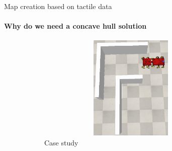 \documentclass[aspectratio=169]{beamer}
\begin{document}
\begin{frame}[t]{Map creation based on tactile data}
    \framesubtitle{Why do we need a concave hull solution}
    \vspace{-15pt}
    \begin{figure}[H]
        \begin{subfigure}[t]{0.3\textwidth}
            \centering\includegraphics[height=5cm,width=1\textwidth,keepaspectratio]{convex_terr.png}
            \caption*{Case study}
            \label{fig:convex_terr.png}
        \end{subfigure}
        \hfill
        \begin{subfigure}[t]{0.33\textwidth}
                \centering
\end{subfigure}
\end{figure}
\end{frame}
\end{document}
